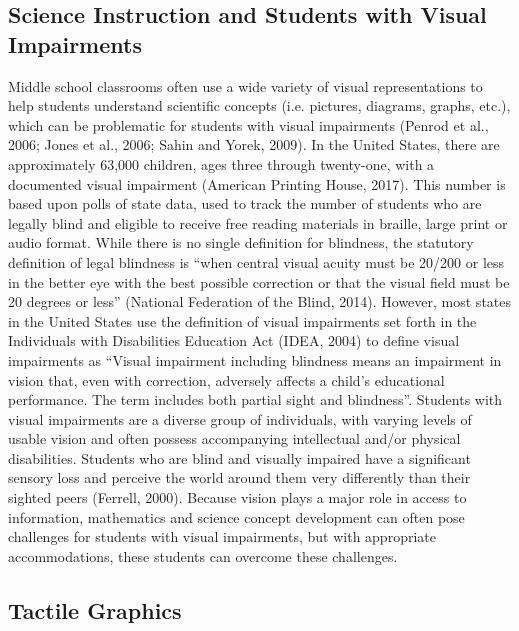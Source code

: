 \documentclass[11.5pt]{sig-alternate} %
\begin{document}
\begin{large}
\subsection*{Science Instruction and Students with Visual Impairments}

Middle school classrooms often use a wide variety of visual representations to help students understand scientific concepts (i.e. pictures, diagrams, graphs, etc.), which can be problematic for students with visual impairments (Penrod et al., 2006; Jones et al., 2006; Sahin and Yorek, 2009).  In the United States, there are approximately 63,000 children, ages three through twenty-one, with a documented visual impairment (American Printing House, 2017).  This number is based upon polls of state data, used to track the number of students who are legally blind and eligible to receive free reading materials in braille, large print or audio format.   While there is no single definition for blindness, the statutory definition of legal blindness is “when central visual acuity must be 20/200 or less in the better eye with the best possible correction or that the visual field must be 20 degrees or less” (National Federation of the Blind, 2014). However, most states in the United States use the definition of visual impairments set forth in the Individuals with Disabilities Education Act (IDEA, 2004) to define visual impairments as “Visual impairment including blindness means an impairment in vision that, even with correction, adversely affects a child’s educational performance.  The term includes both partial sight and blindness”.  Students with visual impairments are a diverse group of individuals, with varying levels of usable vision and often possess accompanying intellectual and/or physical disabilities.  Students who are blind and visually impaired have a significant sensory loss and perceive the world around them very differently than their sighted peers (Ferrell, 2000).  Because vision plays a major role in access to information, mathematics and science concept development can often pose challenges for students with visual impairments, but with appropriate accommodations, these students can overcome these challenges. 

\subsection*{Tactile Graphics}


\end{large}
\end{document}
